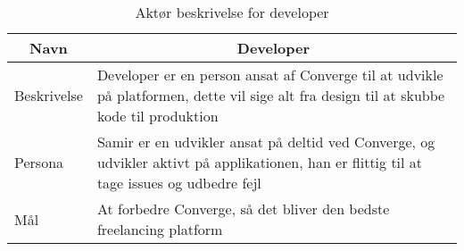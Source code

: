 \begin{table}[H]
    \begin{small}
        \caption{Aktør beskrivelse for developer}
        \label{tab:developer}
        \begin{center}
            \begin{tabular}[c]{p{3cm}|p{8cm}}
                \multicolumn{1}{c|}{\textbf{Navn}} & \multicolumn{1}{c}{\textbf{Developer}}                                                                                                                              \\
                \hline
                Beskrivelse                        & \multicolumn{1}{p{10cm}}{Developer er en person ansat af Converge til at udvikle på platformen, dette vil sige alt fra design til at skubbe kode til produktion}    \\
                \hline
                Persona                            & \multicolumn{1}{p{10cm}}{Samir er en udvikler ansat på deltid ved Converge, og udvikler aktivt på applikationen, han er flittig til at tage issues og udbedre fejl} \\
                \hline
                Mål                                & \multicolumn{1}{p{10cm}}{At forbedre Converge, så det bliver den bedste freelancing platform}                                                                       \\
            \end{tabular}
        \end{center}
    \end{small}
\end{table}

